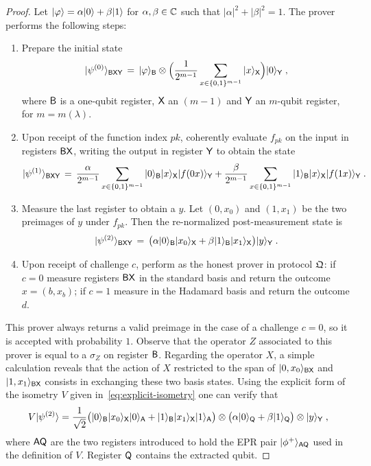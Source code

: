 \begin{proof}
Let $|\varphi\rangle = \alpha|0\rangle + \beta |1\rangle$ for $\alpha,\beta\in\mathbb{C}$ such that $|\alpha|^2 + |\beta|^2 =1$. The prover performs the following steps:
\begin{enumerate}
\item Prepare the initial state 
\[ |\psi^{(0)}\rangle_{{\textsf{BXY}}} \,=\, |\varphi\rangle_{\textsf{B}}\otimes \Big(\frac{1}{2^{m-1}} \sum_{x\in\{0,1\}^{m-1}} |x\rangle_{{\textsf{X}}}\Big) |0\rangle_{{\textsf{Y}}}\;,\]
where ${\textsf{B}}$ is a one-qubit register, ${\textsf{X}}$ an $(m-1)$ and ${\textsf{Y}}$ an $m$-qubit register, for $m=m(\lambda)$. 
\item Upon receipt of the function index $pk$, coherently evaluate $f_{pk}$ on the input in registers ${\textsf{BX}}$, writing the output in register ${\textsf{Y}}$ to obtain the state
\[ |\psi^{(1)}\rangle_{{\textsf{BXY}}} \,=\,  \frac{\alpha}{2^{m-1}}\sum_{x\in\{0,1\}^{m-1}} |0\rangle_{\textsf{B}}|x\rangle_{\textsf{X}}|f(0x)\rangle_{\textsf{Y}} +  \frac{\beta }{2^{m-1}}\sum_{x\in\{0,1\}^{m-1}} |1\rangle_{\textsf{B}}|x\rangle_{\textsf{X}}|f(1x)\rangle_{\textsf{Y}} \;.\]
\item Measure the last register to obtain a $y$. Let $(0,x_0)$ and $(1,x_1)$ be the two preimages of $y$ under $f_{pk}$. Then the re-normalized post-measurement state is
\[ |\psi^{(2)}\rangle_{{\textsf{BXY}}} \,=\, \big(\alpha |0\rangle_{\textsf{B}}|x_0\rangle_{\textsf{X}} + \beta |1\rangle_{\textsf{B}}|x_1\rangle_{\textsf{X}}\big)|y\rangle_{\textsf{Y}} \;.\]
\item Upon receipt of challenge $c$, perform as the honest prover in protocol $\mathfrak{Q}$: if $c=0$ measure registers ${\textsf{BX}}$ in the standard basis and return the outcome $x=(b,x_b)$; if $c=1$ measure in the Hadamard basis and return the outcome $d$.
\end{enumerate}
This prover always returns a valid preimage in the case of a challenge $c=0$, so it is accepted with probability $1$. Observe that the operator $Z$ associated to this prover is equal to a $\sigma_Z$ on register ${\textsf{B}}$. Regarding the operator $X$, a simple calculation reveals that the action of $X$ restricted to the span of $|0,x_0\rangle_{{\textsf{BX}}}$ and $|1,x_1\rangle_{{\textsf{BX}}}$ consists in exchanging these two basis states. Using the explicit form of the isometry $V$ given in~\eqref{eq:explicit-isometry} one can verify that 
\[ V |\psi^{(2)}\rangle = \frac{1}{\sqrt{2}}\big(|0\rangle_{\textsf{B}} |x_0\rangle_{\textsf{X}} |0\rangle_{\textsf{A}} + |1\rangle_{\textsf{B}} |x_1\rangle_{\textsf{X}} |1\rangle_{\textsf{A}}\big) \otimes \big(\alpha|0\rangle_{\textsf{Q}} + \beta|1\rangle_{{\textsf{Q}}} \big)\otimes |y\rangle_{\textsf{Y}}\;,\]
where ${\textsf{AQ}}$ are the two registers introduced to hold the EPR pair $|\phi^+\rangle_{{\textsf{AQ}}}$ used in the definition of $V$. Register ${\textsf{Q}}$ contains the extracted qubit. 
\end{proof}


